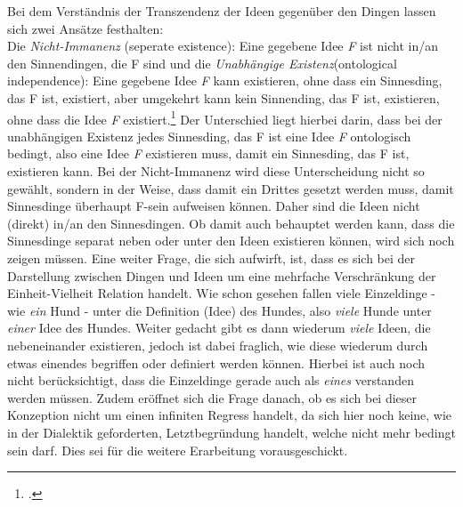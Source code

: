 Bei dem Verständnis der Transzendenz der Ideen gegenüber den Dingen lassen sich zwei Ansätze festhalten:\\
Die \emph{Nicht-Immanenz} (seperate existence): Eine gegebene Idee \emph{F} ist nicht in/an den Sinnendingen, die F sind und die \emph{Unabhängige Existenz}(ontological independence): Eine gegebene Idee \emph{F} kann existieren, ohne dass ein Sinnesding, das F ist, existiert, aber umgekehrt kann kein Sinnending, das F ist, existieren, ohne dass die Idee \emph{F} existiert.\footcite[][S.348]{StrobelTranszendenz}
Der Unterschied liegt hierbei darin, dass bei der unabhängigen Existenz jedes Sinnesding, das F ist eine Idee \emph{F} ontologisch bedingt, also eine Idee \emph{F} existieren muss, damit ein Sinnesding, das F ist, existieren kann. Bei der Nicht-Immanenz wird diese Unterscheidung nicht so gewählt, sondern in der Weise, dass damit ein Drittes gesetzt werden muss, damit Sinnesdinge überhaupt F-sein aufweisen können. Daher sind die Ideen nicht (direkt) in/an den Sinnesdingen. Ob damit auch behauptet werden kann, dass die Sinnesdinge separat neben oder unter den Ideen existieren können, wird sich noch zeigen müssen.
Eine weiter Frage, die sich aufwirft, ist, dass es sich bei der Darstellung zwischen Dingen und Ideen um eine mehrfache Verschränkung der Einheit-Vielheit Relation handelt. Wie schon gesehen fallen viele Einzeldinge - wie \emph{ein} Hund - unter die Definition (Idee) des Hundes, also \emph{viele} Hunde unter \emph{einer} Idee des Hundes. Weiter gedacht gibt es dann wiederum \emph{viele} Ideen, die nebeneinander existieren, jedoch ist dabei fraglich, wie diese wiederum durch etwas einendes begriffen oder definiert werden können. Hierbei ist auch noch nicht berücksichtigt, dass die Einzeldinge gerade auch als \emph{eines} verstanden werden müssen. Zudem eröffnet sich die Frage danach, ob es sich bei dieser Konzeption nicht um einen infiniten Regress handelt, da sich hier noch keine, wie in der Dialektik geforderten, Letztbegründung handelt, welche nicht mehr bedingt sein darf. Dies sei für die weitere Erarbeitung vorausgeschickt.
